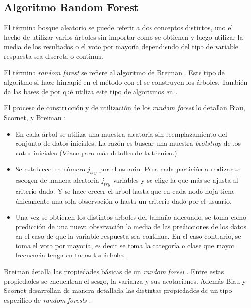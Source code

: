 \subsection{Algoritmo Random Forest}

\noindent El término bosque aleatorio se puede referir a dos conceptos distintos, uno el hecho de utilizar varios árboles sin importar como se obtienen y luego utilizar la media de los resultados o el voto por mayoría dependiendo del tipo de variable respuesta sea discreta o continua. 

\noindent El término \emph{random forest} se refiere al algoritmo de Breiman  \cite{Breiman 2001}. Este tipo de algoritmo si hace hincapié en el  método con el se construyen los árboles. También da las bases de por qué utiliza este tipo de algoritmos en \cite{Breiman 1996}.

\noindent El proceso de construcción y de utilización de los \emph{random forest} lo detallan Biau,  Scornet, y Breiman \cite{Biau 2016,Breiman 2004a} :
\begin{itemize}
\item En cada árbol se utiliza una muestra aleatoria sin reemplazamiento del conjunto de datos iniciales. La razón es buscar una muestra \emph{bootstrap} de los datos iniciales (Véase \cite{Hesterberg 2011} para más detalles de la técnica.)
\item Se establece un número $j_{try}$ por el usuario. Para cada partición a realizar se escogen de manera aleatoria $j_{try}$ variables y se elige la que más se ajusta al criterio dado. Y se hace crecer el árbol hasta que en cada nodo hoja tiene únicamente una sola observación o hasta un criterio dado por el usuario. 
 
\item Una vez se obtienen los distintos árboles del tamaño adecuado, se toma como predicción de una nueva observación la media de las predicciones de los datos en el caso de que la variable respuesta sea continua. En el caso contrario, se toma el voto por mayoría, es decir se toma la categoría o clase que mayor frecuencia tenga en todos los árboles. 
\end{itemize}

\noindent Breiman detalla las propiedades básicas de un \emph{random forest}  \cite {Breiman 2004a}. Entre estas propiedades se encuentran el sesgo, la varianza y sus acotaciones. Además Biau  y Scornet desarrollan de manera detallada las distintas propiedades de un tipo específico de \emph{random forests} \cite{Biau 2016}.

